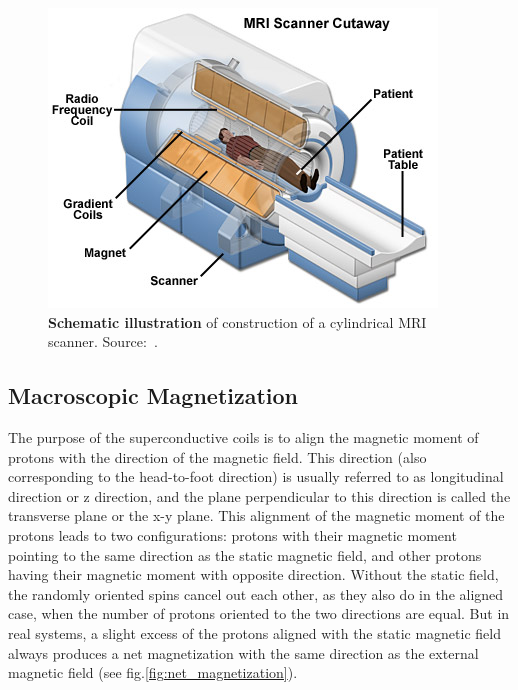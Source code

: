 \begin{figure}
    \centering
    \includegraphics[width=.5\linewidth]{images/mri-scanner.jpg}
    \caption{\textbf{Schematic illustration} of construction of a cylindrical MRI scanner. Source:~\cite{coyne_mri_2020}.}
    \label{fig:mri_schematic}
\end{figure}

\subsection{Macroscopic Magnetization}
The purpose of the superconductive coils is to align the magnetic moment of protons with the direction of the magnetic field. This direction (also corresponding to the head-to-foot direction) is usually referred to as longitudinal direction or z direction, and the plane perpendicular to this direction is called the transverse plane or the x-y plane. This alignment of the magnetic moment of the protons leads to two configurations: protons with their magnetic moment pointing to the same direction as the static magnetic field, and other protons having their magnetic moment with opposite direction. Without the static field, the randomly oriented spins cancel out each other, as they also do in the aligned case, when the number of protons oriented to the two directions are equal. But in real systems, a slight excess of the protons aligned with the static magnetic field always produces a net magnetization with the same direction as the external magnetic field (see fig.\ref{fig:net_magnetization}).

